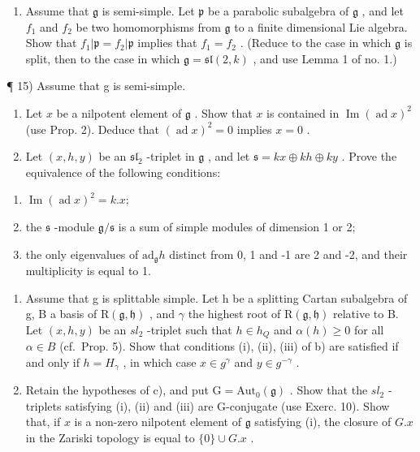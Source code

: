 \begin{enumerate}
\def\labelenumi{\arabic{enumi})}
\setcounter{enumi}{13}
\tightlist
\item
  Assume that \(\mathfrak{g}\) is semi-simple. Let \(\mathfrak{p}\) be a parabolic subalgebra of \(\mathfrak{g}\) , and let \(f_{1}\) and \(f_{2}\) be two homomorphisms from \(\mathfrak{g}\) to a finite dimensional Lie algebra. Show that \(f_{1}|\mathfrak{p} = f_{2}|\mathfrak{p}\) implies that \(f_{1} = f_{2}\) . (Reduce to the case in which \(\mathfrak{g}\) is split, then to the case in which \(\mathfrak{g} = \mathfrak{sl}(2,k)\) , and use Lemma 1 of no. 1.)
\end{enumerate}

¶ 15) Assume that g is semi-simple.

\begin{enumerate}
\def\labelenumi{\alph{enumi})}
\item
  Let \(x\) be a nilpotent element of \(\mathfrak{g}\) . Show that \(x\) is contained in \(\operatorname{Im}(\operatorname{ad} x)^2\) (use Prop. 2). Deduce that \((\operatorname{ad} x)^2 = 0\) implies \(x = 0\) .
\item
  Let \((x,h,y)\) be an \(\mathfrak{sl}_2\) -triplet in \(\mathfrak{g}\) , and let \(\mathfrak{s} = kx\oplus kh\oplus ky\) . Prove the equivalence of the following conditions:
\end{enumerate}

\begin{enumerate}
\def\labelenumi{(\roman{enumi})}
\item
  \(\operatorname{Im}(\operatorname{ad} x)^{2}=k.x;\)
\item
  the \(\mathfrak{s}\) -module \(\mathfrak{g} / \mathfrak{s}\) is a sum of simple modules of dimension 1 or 2;
\item
  the only eigenvalues of \(\mathrm{ad}_{\mathfrak{g}}h\) distinct from 0, 1 and -1 are 2 and -2, and their multiplicity is equal to 1.
\end{enumerate}

\begin{enumerate}
\def\labelenumi{\alph{enumi})}
\setcounter{enumi}{2}
\item
  Assume that g is splittable simple. Let h be a splitting Cartan subalgebra of g, B a basis of \(\mathrm{R}(\mathfrak{g},\mathfrak{h})\) , and \(\gamma\) the highest root of \(\mathrm{R}(\mathfrak{g},\mathfrak{h})\) relative to B. Let \((x,h,y)\) be an \(sl_{2}\) -triplet such that \(h\in h_{Q}\) and \(\alpha(h)\geq0\) for all \(\alpha\in B\) (cf.~Prop. 5). Show that conditions (i), (ii), (iii) of b) are satisfied if and only if \(h=H_{\gamma}\) , in which case \(x\in g^{\gamma}\) and \(y\in g^{-\gamma}\) .
\item
  Retain the hypotheses of c), and put \(\mathrm{G} = \mathrm{Aut}_{0}(\mathfrak{g})\) . Show that the \(sl_{2}\) -triplets satisfying (i), (ii) and (iii) are G-conjugate (use Exerc. 10). Show that, if \(x\) is a non-zero nilpotent element of \(\mathfrak{g}\) satisfying (i), the closure of \(G.x\) in the Zariski topology is equal to \(\{0\} \cup G.x\) .
\end{enumerate}


